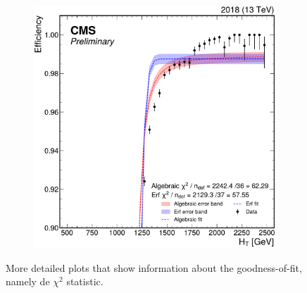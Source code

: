 \begin{figure}
\begin{subfigure}{.36\linewidth}
	\end{subfigure}%
	\begin{subfigure}{.36\linewidth}
		\includegraphics[width=\linewidth]{Images/pdfs/fits_closeup_18.pdf}
	\end{subfigure}
	\caption{More detailed plots that show information about the goodness-of-fit, namely de $\chi^2$ statistic.}
	\label{fig:fits}
\end{figure}

\clearpage
